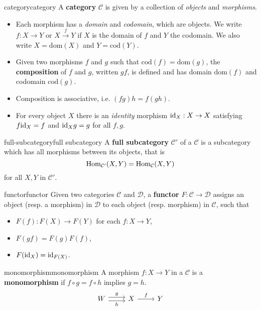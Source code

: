 \begin{topic}{category}{category}
    A \textbf{category} $\mathcal{C}$ is given by a collection of \textit{objects} and \textit{morphisms}.
    \begin{itemize}
        \item Each morphism has a \textit{domain} and \textit{codomain}, which are objects. We write $f : X \to Y$ or $X \overset{f}{\to} Y$ if $X$ is the domain of $f$ and $Y$ the codomain. We also write $X = \text{dom}(X)$ and $Y = \text{cod}(Y)$.
        
        \item Given two morphisms $f$ and $g$ such that $\text{cod}(f) = \text{dom}(g)$, the \textbf{composition} of $f$ and $g$, written $gf$, is defined and has domain $\text{dom}(f)$ and codomain $\text{cod}(g)$.
        
        \item Composition is associative, i.e. $(fg)h = f(gh)$.
        
        \item For every object $X$ there is an \textit{identity} morphism $\text{id}_X : X \to X$ satisfying $f \text{id}_X = f$ and $\text{id}_X g = g$ for all $f, g$.
    \end{itemize}
\end{topic}

\begin{topic}{full-subcategory}{full subcategory}
    A \textbf{full subcategory} $\mathcal{C}'$ of a  $\mathcal{C}$ is a subcategory which has all morphisms between its objects, that is
    \[ \text{Hom}_{\mathcal{C}'}(X, Y) = \text{Hom}_{\mathcal{C}}(X, Y) \]
    for all $X, Y$ in $\mathcal{C}'$.
\end{topic}

\begin{topic}{functor}{functor}
    Given two categories $\mathcal{C}$ and $\mathcal{D}$, a \textbf{functor} $F : \mathcal{C} \to \mathcal{D}$ assigns an object (resp. a morphism) in $\mathcal{D}$ to each object (resp. morphism) in $\mathcal{C}$, such that
    \begin{itemize}
        \item $F(f) : F(X) \to F(Y)$ for each $f : X \to Y$,
        \item $F(gf) = F(g) F(f)$,
        \item $F(\text{id}_X) = \text{id}_{F(X)}$.
    \end{itemize}
\end{topic}

\begin{topic}{monomorphism}{monomorphism}
    A morphism $f : X \to Y$ in a  $\mathcal{C}$ is a \textbf{monomorphism} if $f \circ g = f \circ h$ implies $g = h$.
    \[ \begin{tikzcd} W \arrow[shift left=0.25em]{r}{g} \arrow[shift right=0.25em, swap]{r}{h} & X \arrow{r}{f} & Y \end{tikzcd} \]
\end{topic}


